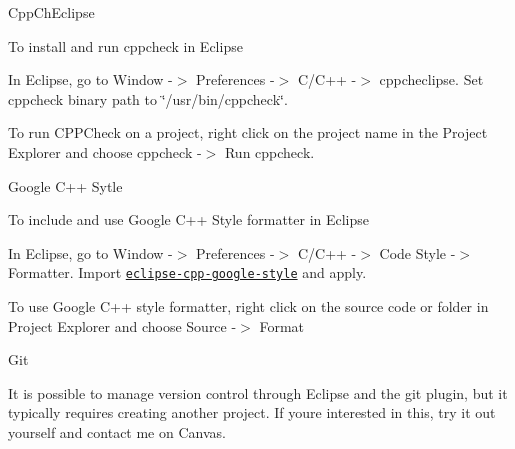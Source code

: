 \begin{DoxyItemize}
\item Cpp\+Ch\+Eclipse

To install and run cppcheck in Eclipse
\begin{DoxyEnumerate}
\item In Eclipse, go to Window -\/$>$ Preferences -\/$>$ C/\+C++ -\/$>$ cppcheclipse. Set cppcheck binary path to \char`\"{}/usr/bin/cppcheck\char`\"{}.
\item To run C\+P\+P\+Check on a project, right click on the project name in the Project Explorer and choose cppcheck -\/$>$ Run cppcheck.
\end{DoxyEnumerate}
\item Google C++ Sytle

To include and use Google C++ Style formatter in Eclipse
\begin{DoxyEnumerate}
\item In Eclipse, go to Window -\/$>$ Preferences -\/$>$ C/\+C++ -\/$>$ Code Style -\/$>$ Formatter. Import \href{https://raw.githubusercontent.com/google/styleguide/gh-pages/eclipse-cpp-google-style.xml}{\tt eclipse-\/cpp-\/google-\/style} and apply.
\item To use Google C++ style formatter, right click on the source code or folder in Project Explorer and choose Source -\/$>$ Format
\end{DoxyEnumerate}
\item Git

It is possible to manage version control through Eclipse and the git plugin, but it typically requires creating another project. If you\textquotesingle{}re interested in this, try it out yourself and contact me on Canvas. 
\end{DoxyItemize}
